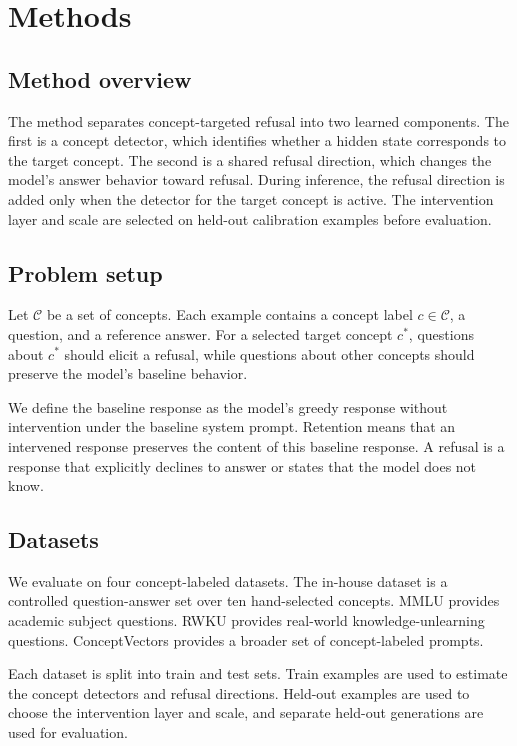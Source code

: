 \documentclass{article}
\begin{document}
\section{Methods}

\subsection{Method overview}

The method separates concept-targeted refusal into two learned components. The
first is a concept detector, which identifies whether a hidden state corresponds
to the target concept. The second is a shared refusal direction, which changes
the model's answer behavior toward refusal. During inference, the refusal
direction is added only when the detector for the target concept is active. The
intervention layer and scale are selected on held-out calibration examples
before evaluation.

\subsection{Problem setup}

Let $\mathcal{C}$ be a set of concepts. Each example contains a concept label $c \in \mathcal{C}$, a question, and a reference answer. For a selected target concept $c^\ast$, questions about $c^\ast$ should elicit a refusal, while questions about other concepts should preserve the model's baseline behavior.

We define the baseline response as the model's greedy response without
intervention under the baseline system prompt. Retention means that an intervened response preserves the content of this baseline response. A refusal is a response that explicitly declines to
answer or states that the model does not know.

\subsection{Datasets}

We evaluate on four concept-labeled datasets. The in-house dataset is a
controlled question-answer set over ten hand-selected concepts. MMLU provides
academic subject questions. RWKU provides real-world knowledge-unlearning
questions. ConceptVectors provides a broader set of concept-labeled prompts.

Each dataset is split into train and test sets. Train examples are used to
estimate the concept detectors and refusal directions. Held-out examples are
used to choose the intervention layer and scale, and separate held-out
generations are used for evaluation.
\end{document}
